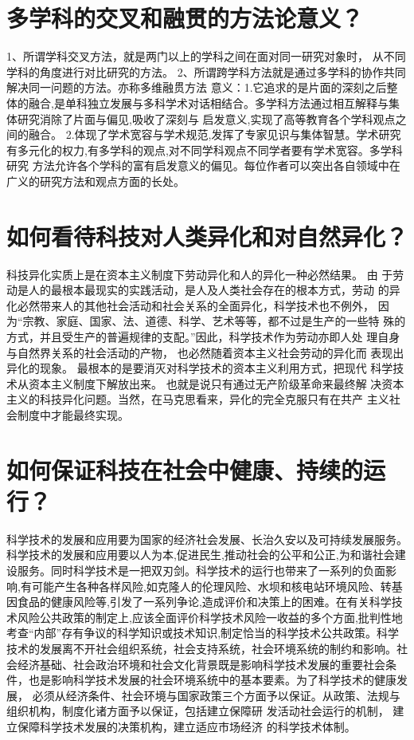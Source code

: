 \documentclass[a4paper]{article}
\begin{document}
\section{多学科的交叉和融贯的方法论意义？}

1、所谓学科交叉方法，就是两门以上的学科之间在面对同一研究对象时， 从不同学科的角度进行对比研究的方法。 2、所谓跨学科方法就是通过多学科的协作共同解决同一问题的方法。亦称多维融贯方法 意义：1.它追求的是片面的深刻之后整体的融合,是单科独立发展与多科学术对话相结合。多学科方法通过相互解释与集体研究消除了片面与偏见,吸收了深刻与 启发意义,实现了高等教育各个学科观点之间的融合。 2.体现了学术宽容与学术规范,发挥了专家见识与集体智慧。学术研究有多元化的权力,有多学科的观点,对不同学科观点不同学者要有学术宽容。多学科研究 方法允许各个学科的富有启发意义的偏见。每位作者可以突出各自领域中在广义的研究方法和观点方面的长处。

\section{如何看待科技对人类异化和对自然异化？}

科技异化实质上是在资本主义制度下劳动异化和人的异化一种必然结果。 由 于劳动是人的最根本最现实的实践活动，是人及人类社会存在的根本方式，劳动 的异化必然带来人的其他社会活动和社会关系的全面异化，科学技术也不例外， 因为“宗教、家庭、国家、法、道德、科学、艺术等等，都不过是生产的一些特 殊的方式，并且受生产的普遍规律的支配。”因此，科学技术作为劳动亦即人处 理自身与自然界关系的社会活动的产物， 也必然随着资本主义社会劳动的异化而 表现出异化的现象。 最根本的是要消灭对科学技术的资本主义利用方式，把现代 科学技术从资本主义制度下解放出来。 也就是说只有通过无产阶级革命来最终解 决资本主义的科技异化问题。当然，在马克思看来，异化的完全克服只有在共产 主义社会制度中才能最终实现。

\section{如何保证科技在社会中健康、持续的运行？}

科学技术的发展和应用要为国家的经济社会发展、长治久安以及可持续发展服务。 科学技术的发展和应用要以人为本,促进民生,推动社会的公平和公正,为和谐社会建设服务。同时科学技术是一把双刃剑。科学技术的运行也带来了一系列的负面影响,有可能产生各种各样风险,如克隆人的伦理风险、水坝和核电站环境风险、转基因食品的健康风险等,引发了一系列争论,造成评价和决策上的困难。在有关科学技术风险公共政策的制定上,应该全面评价科学技术风险一收益的多个方面,批判性地考查“内部”存有争议的科学知识或技术知识,制定恰当的科学技术公共政策。科学技术的发展离不开社会组织系统，社会支持系统，社会环境系统的制约和影响。社会经济基础、社会政治环境和社会文化背景既是影响科学技术发展的重要社会条件，也是影响科学技术发展的社会环境系统中的基本要素。为了科学技术的健康发展， 必须从经济条件、社会环境与国家政策三个方面予以保证。从政策、法规与组织机构，制度化诸方面予以保证，包括建立保障研 发活动社会运行的机制， 建立保障科学技术发展的决策机构，建立适应市场经济 的科学技术体制。
\end{document}
